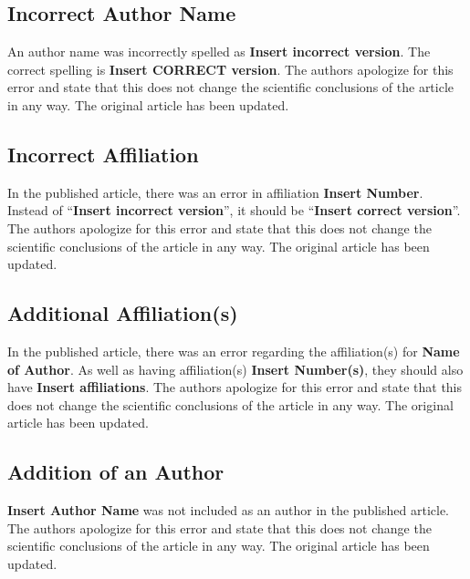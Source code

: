 \documentclass[utf8]{frontiers_correction}
\begin{document}

\subsection*{Incorrect Author Name}
An author name was incorrectly spelled as \textbf{Insert incorrect version}. The correct spelling is \textbf{Insert CORRECT version}. The authors apologize for this error and state that this does not change the scientific conclusions of the article in any way. The original article has been updated.

\subsection*{Incorrect Affiliation}
In the published article, there was an error in affiliation \textbf{Insert Number}. Instead of “\textbf{Insert incorrect version}”, it should be “\textbf{Insert correct version}”. The authors apologize for this error and state that this does not change the scientific conclusions of the article in any way. The original article has been updated.

\subsection*{Additional Affiliation(s)}
In the published article, there was an error regarding the affiliation(s) for \textbf{Name of Author}. As well as having affiliation(s) \textbf{Insert Number(s)}, they should also have \textbf{Insert affiliations}. The authors apologize for this error and state that this does not change the scientific conclusions of the article in any way. The original article has been updated.

\subsection*{Addition of an Author}
\textbf{Insert Author Name} was not included as an author in the published article. The authors apologize for this error and state that this does not change the scientific conclusions of the article in any way. The original article has been updated.
\end{document}

